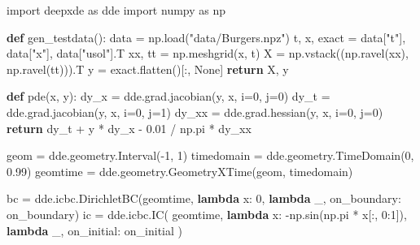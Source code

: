 \documentclass[
  spanish,
  us-letterpaper,
  DIV=11,
  numbers=noendperiod]{scrreprt}
\newenvironment{Shaded}{\begin{snugshade}}{\end{snugshade}}
\newcommand{\ControlFlowTok}[1]{\textcolor[rgb]{0.00,0.23,0.31}{\textbf{#1}}}
\newcommand{\DecValTok}[1]{\textcolor[rgb]{0.68,0.00,0.00}{#1}}
\newcommand{\FloatTok}[1]{\textcolor[rgb]{0.68,0.00,0.00}{#1}}
\newcommand{\ImportTok}[1]{\textcolor[rgb]{0.00,0.46,0.62}{#1}}
\newcommand{\KeywordTok}[1]{\textcolor[rgb]{0.00,0.23,0.31}{\textbf{#1}}}
\newcommand{\NormalTok}[1]{\textcolor[rgb]{0.00,0.23,0.31}{#1}}
\newcommand{\OperatorTok}[1]{\textcolor[rgb]{0.37,0.37,0.37}{#1}}
\newcommand{\StringTok}[1]{\textcolor[rgb]{0.13,0.47,0.30}{#1}}
\newcommand{\VariableTok}[1]{\textcolor[rgb]{0.07,0.07,0.07}{#1}}
\theoremstyle{plain}
\theoremstyle{definition}
\theoremstyle{remark}
\begin{document}
\begin{Shaded}
\begin{Highlighting}[]
\ImportTok{import}\NormalTok{ deepxde }\ImportTok{as}\NormalTok{ dde}
\ImportTok{import}\NormalTok{ numpy }\ImportTok{as}\NormalTok{ np}


\KeywordTok{def}\NormalTok{ gen\_testdata():}
\NormalTok{    data }\OperatorTok{=}\NormalTok{ np.load(}\StringTok{"data/Burgers.npz"}\NormalTok{)}
\NormalTok{    t, x, exact }\OperatorTok{=}\NormalTok{ data[}\StringTok{"t"}\NormalTok{], data[}\StringTok{"x"}\NormalTok{], data[}\StringTok{"usol"}\NormalTok{].T}
\NormalTok{    xx, tt }\OperatorTok{=}\NormalTok{ np.meshgrid(x, t)}
\NormalTok{    X }\OperatorTok{=}\NormalTok{ np.vstack((np.ravel(xx), np.ravel(tt))).T}
\NormalTok{    y }\OperatorTok{=}\NormalTok{ exact.flatten()[:, }\VariableTok{None}\NormalTok{]}
    \ControlFlowTok{return}\NormalTok{ X, y}


\KeywordTok{def}\NormalTok{ pde(x, y):}
\NormalTok{    dy\_x }\OperatorTok{=}\NormalTok{ dde.grad.jacobian(y, x, i}\OperatorTok{=}\DecValTok{0}\NormalTok{, j}\OperatorTok{=}\DecValTok{0}\NormalTok{)}
\NormalTok{    dy\_t }\OperatorTok{=}\NormalTok{ dde.grad.jacobian(y, x, i}\OperatorTok{=}\DecValTok{0}\NormalTok{, j}\OperatorTok{=}\DecValTok{1}\NormalTok{)}
\NormalTok{    dy\_xx }\OperatorTok{=}\NormalTok{ dde.grad.hessian(y, x, i}\OperatorTok{=}\DecValTok{0}\NormalTok{, j}\OperatorTok{=}\DecValTok{0}\NormalTok{)}
    \ControlFlowTok{return}\NormalTok{ dy\_t }\OperatorTok{+}\NormalTok{ y }\OperatorTok{*}\NormalTok{ dy\_x }\OperatorTok{{-}} \FloatTok{0.01} \OperatorTok{/}\NormalTok{ np.pi }\OperatorTok{*}\NormalTok{ dy\_xx}


\NormalTok{geom }\OperatorTok{=}\NormalTok{ dde.geometry.Interval(}\OperatorTok{{-}}\DecValTok{1}\NormalTok{, }\DecValTok{1}\NormalTok{)}
\NormalTok{timedomain }\OperatorTok{=}\NormalTok{ dde.geometry.TimeDomain(}\DecValTok{0}\NormalTok{, }\FloatTok{0.99}\NormalTok{)}
\NormalTok{geomtime }\OperatorTok{=}\NormalTok{ dde.geometry.GeometryXTime(geom, timedomain)}

\NormalTok{bc }\OperatorTok{=}\NormalTok{ dde.icbc.DirichletBC(geomtime, }\KeywordTok{lambda}\NormalTok{ x: }\DecValTok{0}\NormalTok{, }\KeywordTok{lambda}\NormalTok{ \_, on\_boundary: on\_boundary)}
\NormalTok{ic }\OperatorTok{=}\NormalTok{ dde.icbc.IC(}
\NormalTok{    geomtime, }\KeywordTok{lambda}\NormalTok{ x: }\OperatorTok{{-}}\NormalTok{np.sin(np.pi }\OperatorTok{*}\NormalTok{ x[:, }\DecValTok{0}\NormalTok{:}\DecValTok{1}\NormalTok{]), }\KeywordTok{lambda}\NormalTok{ \_, on\_initial: on\_initial}
\NormalTok{)}


\end{Highlighting}
\end{Shaded}
\end{document}
